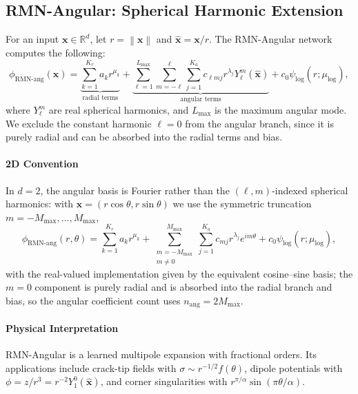 \documentclass[twoside,11pt]{article}
\newcommand{\R}{\mathbb{R}}
\newcommand{\bx}{\bm{x}}
\newcommand{\norm}[1]{\left\|#1\right\|}
\begin{document}
\subsection{RMN-Angular: Spherical Harmonic Extension}
\label{subsec:rmn_angular}

\begin{definition}
	For an input $\bx \in \R^d$, let $r = \norm{\bx}$ and $\hat{\bx} = \bx/r$. The RMN-Angular network computes the following:
	\begin{equation}
		\phi_{\text{RMN-ang}}(\bx) = \underbrace{\sum_{k=1}^{K_r} a_k r^{\mu_k}}_{\text{radial terms}} + \underbrace{\sum_{\ell=1}^{L_{\max}} \sum_{m=-\ell}^{\ell} \sum_{j=1}^{K_a} c_{\ell m j} r^{\lambda_j} Y_\ell^m(\hat{\bx})}_{\text{angular terms}} + c_0 \psi_{\log}(r;\mu_{\log}),
		\label{eq:rmn_angular}
	\end{equation}
	where $Y_\ell^m$ are real spherical harmonics, and $L_{\max}$ is the maximum angular mode. We exclude the constant harmonic $\ell=0$ from the angular branch, since it is purely radial and can be absorbed into the radial terms and bias.
\end{definition}

\paragraph{2D Convention} In $d=2$, the angular basis is Fourier rather than the $(\ell,m)$-indexed spherical harmonics: with $\bx=(r\cos\theta,r\sin\theta)$ we use the symmetric truncation $m=-M_{\max},\ldots,M_{\max}$,
\begin{equation*}
	\phi_{\text{RMN-ang}}(r,\theta) = \sum_{k=1}^{K_r} a_k r^{\mu_k} + \sum_{\substack{m=-M_{\max} \\ m\neq 0}}^{M_{\max}} \sum_{j=1}^{K_a} c_{m j} r^{\lambda_j} e^{im\theta} + c_0 \psi_{\log}(r;\mu_{\log}),
\end{equation*}
with the real-valued implementation given by the equivalent cosine--sine basis; the $m=0$ component is purely radial and is absorbed into the radial branch and bias, so the angular coefficient count uses $n_{\text{ang}}=2M_{\max}$.

\paragraph{Physical Interpretation} RMN-Angular is a learned multipole expansion with fractional orders. Its applications include crack-tip fields with $\sigma \sim r^{-1/2} f(\theta)$, dipole potentials with $\phi = z/r^3 = r^{-2} Y_1^0(\hat{\bx})$, and corner singularities with $r^{\pi/\alpha} \sin(\pi\theta/\alpha)$.
\end{document}
